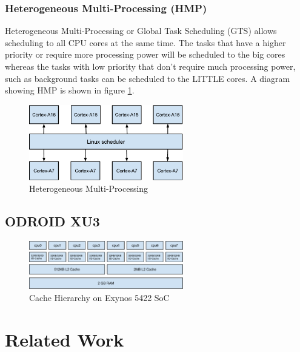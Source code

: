 \documentclass[11pt]{book}
\begin{document}
\subsection{Heterogeneous Multi-Processing (HMP)}

Heterogeneous Multi-Processing or Global Task Scheduling (GTS) allows scheduling to all CPU cores
at the same time. The tasks that have a higher priority or require more processing power will be
scheduled to the big cores whereas the tasks with low priority that don't require much processing
power, such as background tasks can be scheduled to the LITTLE cores. A diagram showing HMP is shown
in figure \ref{global_task_scheduling}.

\begin{figure}
  \centering
  \includegraphics[width=0.6\textwidth]{figs/global_task_scheduling.pdf}
  \caption{Heterogeneous Multi-Processing}\label{global_task_scheduling}
\end{figure}

\section{ODROID XU3}

\begin{figure}
  \centering
  \includegraphics[width=0.6\textwidth]{figs/Odroid-Cache-Hierarchy.pdf}
  \caption{Cache Hierarchy on Exynos 5422 SoC}
\end{figure}


\chapter{Related Work}\label{related_work}
\end{document}
